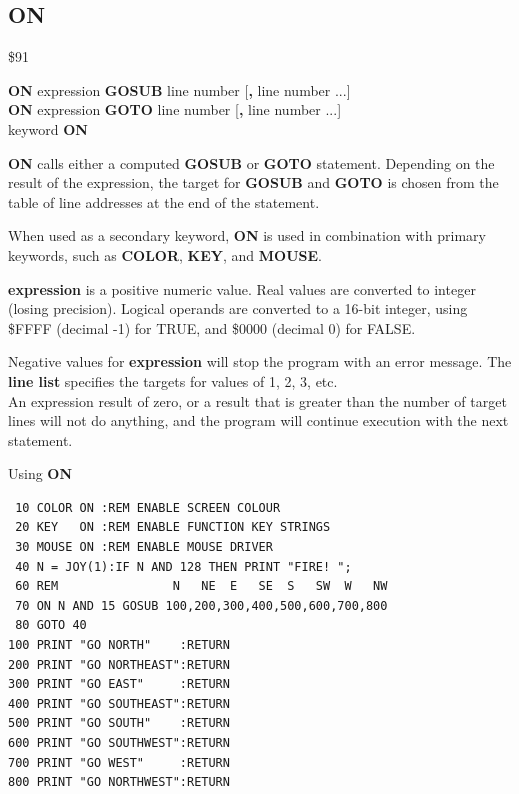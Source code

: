 \subsection{ON}
\begin{description}[leftmargin=2cm,style=nextline]
\item [Token:] \$91
\item [Format:] {\bf ON} expression {\bf GOSUB} line number [{\bf,} line number ...] \\
                {\bf ON} expression {\bf GOTO} line number [{\bf,} line number ...] \\
                keyword {\bf ON}
\item [Usage:]  {\bf ON} calls
                either a computed {\bf GOSUB} or {\bf GOTO} statement.
                Depending on the result of the expression, the target
                for {\bf GOSUB} and {\bf GOTO} is chosen from
                the table of line addresses at the end of the statement.

                When used as a secondary keyword, {\bf ON} is used in
                combination with primary keywords, such as
                {\bf COLOR}, {\bf KEY}, and  {\bf MOUSE}.

                {\bf expression} is a positive numeric value.
                Real values are converted to integer (losing precision).
                Logical operands are converted to a 16-bit integer,
                using \$FFFF (decimal -1) for TRUE,
                and \$0000 (decimal 0) for FALSE.

\item [Remarks:] Negative values for {\bf expression} will stop
                 the program with an error message.
                 The {\bf line list} specifies the targets for values
                 of 1, 2, 3, etc. \\
                 An expression result of zero, or a result that is greater
                 than the number of target lines will not do anything, and the
                 program will continue execution with the next statement.

\newpage
\item [Example:] Using {\bf ON}
\begin{tcolorbox}[colback=black,coltext=white]
\verbatimfont{\codefont}
\begin{verbatim}
 10 COLOR ON :REM ENABLE SCREEN COLOUR
 20 KEY   ON :REM ENABLE FUNCTION KEY STRINGS
 30 MOUSE ON :REM ENABLE MOUSE DRIVER
 40 N = JOY(1):IF N AND 128 THEN PRINT "FIRE! ";
 60 REM                N   NE  E   SE  S   SW  W   NW
 70 ON N AND 15 GOSUB 100,200,300,400,500,600,700,800
 80 GOTO 40
100 PRINT "GO NORTH"    :RETURN
200 PRINT "GO NORTHEAST":RETURN
300 PRINT "GO EAST"     :RETURN
400 PRINT "GO SOUTHEAST":RETURN
500 PRINT "GO SOUTH"    :RETURN
600 PRINT "GO SOUTHWEST":RETURN
700 PRINT "GO WEST"     :RETURN
800 PRINT "GO NORTHWEST":RETURN
\end{verbatim}
\end{tcolorbox}
\end{description}

